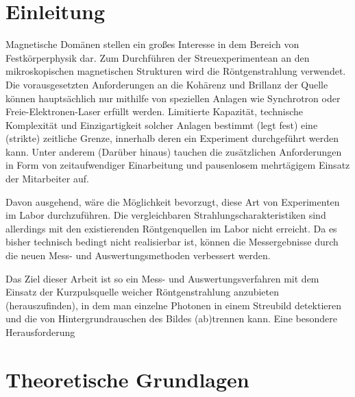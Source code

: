 \chapter{Einleitung}
\label{text:einleitung}
Magnetische Domänen stellen ein großes Interesse in dem Bereich von Festkörperphysik dar. Zum Durchführen der Streuexperimentean an den mikroskopischen magnetischen Strukturen wird die Röntgenstrahlung verwendet. Die vorausgesetzten Anforderungen an die Kohärenz und Brillanz der Quelle können hauptsächlich nur mithilfe von speziellen Anlagen wie Synchrotron oder Freie-Elektronen-Laser erfüllt werden. Limitierte Kapazität, technische Komplexität und Einzigartigkeit solcher Anlagen bestimmt (legt fest) eine (strikte) zeitliche Grenze, innerhalb deren ein Experiment durchgeführt werden kann. Unter anderem (Darüber hinaus) tauchen die zusätzlichen Anforderungen in Form von zeitaufwendiger Einarbeitung und pausenlosem mehrtägigem Einsatz der Mitarbeiter auf.

Davon ausgehend, wäre die Möglichkeit bevorzugt, diese Art von Experimenten im Labor durchzuführen. Die vergleichbaren Strahlungscharakteristiken  sind allerdings mit den existierenden Röntgenquellen im Labor nicht erreicht. Da es bisher technisch bedingt nicht realisierbar ist, können die Messergebnisse durch die neuen Mess- und Auswertungsmethoden verbessert werden.  

Das Ziel dieser Arbeit ist so ein Mess- und Auswertungsverfahren mit dem Einsatz der Kurzpulsquelle weicher Röntgenstrahlung anzubieten (herauszufinden), in dem man einzelne Photonen in einem Streubild detektieren und die von Hintergrundrauschen des Bildes (ab)trennen kann. Eine besondere Herausforderung 



\chapter{Theoretische Grundlagen}
\label{text:theorie}


